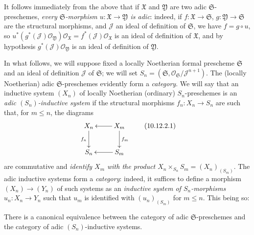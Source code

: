 It follows immediately from the above that if $\mathfrak{X}$ and
$\mathfrak{Y}$ are two adic $\mathfrak{S}$-preschemes, \emph{every
$\mathfrak{S}$-morphism $u:\mathfrak{X}\to\mathfrak{Y}$ is adic}:
indeed, if $f:\mathfrak{X}\to\mathfrak{S}$,
$g:\mathfrak{Y}\to\mathfrak{S}$ are the structural morphisms, and
$\mathscr{J}$ an ideal of definition of $\mathfrak{S}$, we have
$f=g\circ u$, so
$u^*(g^*(\mathscr{J})\mathscr{O}_{\mathfrak{Y}})
\mathscr{O}_{\mathfrak{X}}=f^*(\mathscr{J})
\mathscr{O}_{\mathfrak{X}}$ is an ideal of definition of
$\mathfrak{X}$, and by hypothesis
$g^*(\mathscr{J})\mathscr{O}_{\mathfrak{Y}}$ is an ideal of definition
of $\mathfrak{Y}$.

\begin{env}[10.12.2]
\label{I.10.12.2}
In what follows, we will suppose fixed a locally Noetherian formal
prescheme $\mathfrak{S}$ and an ideal of definition $\mathscr{J}$ of
$\mathfrak{S}$; we will set
$S_n=(\mathfrak{S},\mathscr{O}_{\mathfrak{S}}/\mathscr{J}^{n+1})$. The
(locally Noetherian) adic $\mathfrak{S}$-preschemes evidently form
a \emph{category}. We will say that an inductive system
$(X_n)$ of locally Noetherian (ordinary) $S_n$-preschemes is an
\emph{adic $(S_n)$-inductive system} if the structural morphisms
$f_n:X_n\to S_n$ are such that, for $m\leq n$, the diagrams
\[
  \label{I.10.12.2.1}
  \xymatrix{
    X_n \ar[d]_{f_n}
    & X_m \ar[l] \ar[d]^{f_m}\\
    S_n
    & S_m \ar[l]
  }
  \tag{10.12.2.1}
\]
are commutative and \emph{identify $X_m$ with the product
$X_n\times_{S_n}S_m=(X_n)_{(S_m)}$}. The adic inductive systems
form a \emph{category}: indeed, it suffices to define a morphism
$(X_n)\to(Y_n)$ of such systems as an \emph{inductive system of
$S_n$-morphisms $u_n:X_n\to Y_n$} such that $u_m$ is identified with
$(u_n)_{(S_m)}$ for $m\leq n$. This being so:
\end{env}

\begin{theorem}[10.12.3]
\label{I.10.12.3}
There is a canonical equivalence between the category of
adic $\mathfrak{S}$-preschemes and the category of
adic $(S_n)$-inductive systems.
\end{theorem}

